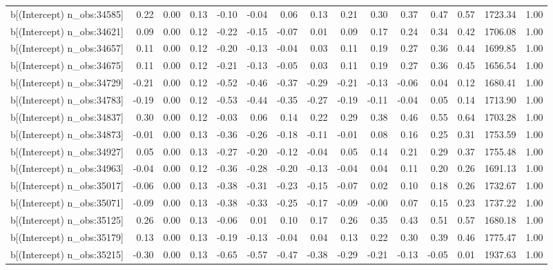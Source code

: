 \begin{table}[ht]
\begin{tabular}{rrrrrrrrrrrrrrr}
  b[(Intercept) n\_obs:34585] & 0.22 & 0.00 & 0.13 & -0.10 & -0.04 & 0.06 & 0.13 & 0.21 & 0.30 & 0.37 & 0.47 & 0.57 & 1723.34 & 1.00 \\ 
  b[(Intercept) n\_obs:34621] & 0.09 & 0.00 & 0.12 & -0.22 & -0.15 & -0.07 & 0.01 & 0.09 & 0.17 & 0.24 & 0.34 & 0.42 & 1706.08 & 1.00 \\ 
  b[(Intercept) n\_obs:34657] & 0.11 & 0.00 & 0.12 & -0.20 & -0.13 & -0.04 & 0.03 & 0.11 & 0.19 & 0.27 & 0.36 & 0.44 & 1699.85 & 1.00 \\ 
  b[(Intercept) n\_obs:34675] & 0.11 & 0.00 & 0.12 & -0.21 & -0.13 & -0.05 & 0.03 & 0.11 & 0.19 & 0.27 & 0.36 & 0.45 & 1656.54 & 1.00 \\ 
  b[(Intercept) n\_obs:34729] & -0.21 & 0.00 & 0.12 & -0.52 & -0.46 & -0.37 & -0.29 & -0.21 & -0.13 & -0.06 & 0.04 & 0.12 & 1680.41 & 1.00 \\ 
  b[(Intercept) n\_obs:34783] & -0.19 & 0.00 & 0.12 & -0.53 & -0.44 & -0.35 & -0.27 & -0.19 & -0.11 & -0.04 & 0.05 & 0.14 & 1713.90 & 1.00 \\ 
  b[(Intercept) n\_obs:34837] & 0.30 & 0.00 & 0.12 & -0.03 & 0.06 & 0.14 & 0.22 & 0.29 & 0.38 & 0.46 & 0.55 & 0.64 & 1703.28 & 1.00 \\ 
  b[(Intercept) n\_obs:34873] & -0.01 & 0.00 & 0.13 & -0.36 & -0.26 & -0.18 & -0.11 & -0.01 & 0.08 & 0.16 & 0.25 & 0.31 & 1753.59 & 1.00 \\ 
  b[(Intercept) n\_obs:34927] & 0.05 & 0.00 & 0.13 & -0.27 & -0.20 & -0.12 & -0.04 & 0.05 & 0.14 & 0.21 & 0.29 & 0.37 & 1755.48 & 1.00 \\ 
  b[(Intercept) n\_obs:34963] & -0.04 & 0.00 & 0.12 & -0.36 & -0.28 & -0.20 & -0.13 & -0.04 & 0.04 & 0.11 & 0.20 & 0.26 & 1691.13 & 1.00 \\ 
  b[(Intercept) n\_obs:35017] & -0.06 & 0.00 & 0.13 & -0.38 & -0.31 & -0.23 & -0.15 & -0.07 & 0.02 & 0.10 & 0.18 & 0.26 & 1732.67 & 1.00 \\ 
  b[(Intercept) n\_obs:35071] & -0.09 & 0.00 & 0.13 & -0.38 & -0.33 & -0.25 & -0.17 & -0.09 & -0.00 & 0.07 & 0.15 & 0.23 & 1737.22 & 1.00 \\ 
  b[(Intercept) n\_obs:35125] & 0.26 & 0.00 & 0.13 & -0.06 & 0.01 & 0.10 & 0.17 & 0.26 & 0.35 & 0.43 & 0.51 & 0.57 & 1680.18 & 1.00 \\ 
  b[(Intercept) n\_obs:35179] & 0.13 & 0.00 & 0.13 & -0.19 & -0.13 & -0.04 & 0.04 & 0.13 & 0.22 & 0.30 & 0.39 & 0.46 & 1775.47 & 1.00 \\ 
  b[(Intercept) n\_obs:35215] & -0.30 & 0.00 & 0.13 & -0.65 & -0.57 & -0.47 & -0.38 & -0.29 & -0.21 & -0.13 & -0.05 & 0.01 & 1937.63 & 1.00 \\ 

\end{tabular}
\end{table}
